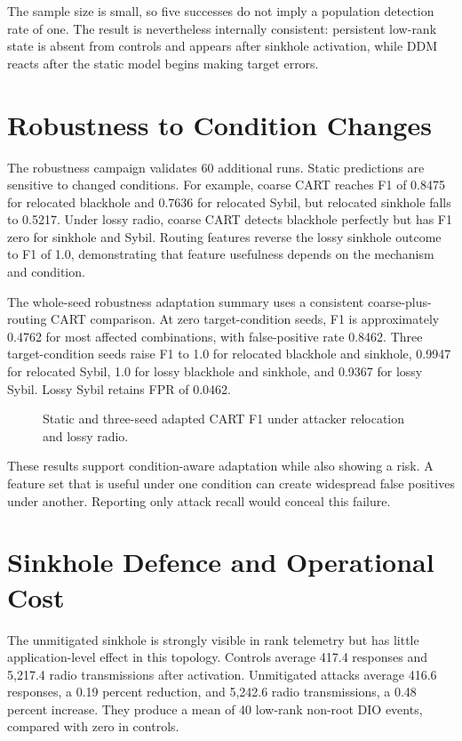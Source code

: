 The sample size is small, so five successes do not imply a population detection rate of one. The result is nevertheless internally consistent: persistent low-rank state is absent from controls and appears after sinkhole activation, while DDM reacts after the static model begins making target errors.

\section{Robustness to Condition Changes}

The robustness campaign validates 60 additional runs. Static predictions are sensitive to changed conditions. For example, coarse CART reaches F1 of 0.8475 for relocated blackhole and 0.7636 for relocated Sybil, but relocated sinkhole falls to 0.5217. Under lossy radio, coarse CART detects blackhole perfectly but has F1 zero for sinkhole and Sybil. Routing features reverse the lossy sinkhole outcome to F1 of 1.0, demonstrating that feature usefulness depends on the mechanism and condition.

The whole-seed robustness adaptation summary uses a consistent coarse-plus-routing CART comparison. At zero target-condition seeds, F1 is approximately 0.4762 for most affected combinations, with false-positive rate 0.8462. Three target-condition seeds raise F1 to 1.0 for relocated blackhole and sinkhole, 0.9947 for relocated Sybil, 1.0 for lossy blackhole and sinkhole, and 0.9367 for lossy Sybil. Lossy Sybil retains FPR of 0.0462.

\begin{figure}[H]
\centering

\caption{Static and three-seed adapted CART F1 under attacker relocation and lossy radio.}
\label{fig:robustness}
\end{figure}

These results support condition-aware adaptation while also showing a risk. A feature set that is useful under one condition can create widespread false positives under another. Reporting only attack recall would conceal this failure.

\section{Sinkhole Defence and Operational Cost}

The unmitigated sinkhole is strongly visible in rank telemetry but has little application-level effect in this topology. Controls average 417.4 responses and 5,217.4 radio transmissions after activation. Unmitigated attacks average 416.6 responses, a 0.19 percent reduction, and 5,242.6 radio transmissions, a 0.48 percent increase. They produce a mean of 40 low-rank non-root DIO events, compared with zero in controls.

